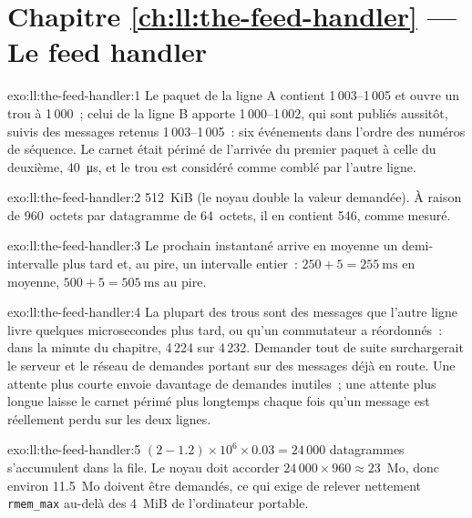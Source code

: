 \section*{Chapitre \ref{ch:ll:the-feed-handler} --- Le feed handler}

\begin{solution}{exo:ll:the-feed-handler:1}
Le paquet de la ligne A contient 1\,003--1\,005 et ouvre un trou à 1\,000~; celui de la ligne B apporte 1\,000--1\,002, qui sont publiés aussitôt,
suivis des messages retenus 1\,003--1\,005~: six événements dans l'ordre des numéros de séquence. Le carnet était périmé de l'arrivée du premier paquet à celle du
deuxième, \qty{40}{\micro\second}, et le trou est considéré comme comblé par l'autre ligne.
\end{solution}

\begin{solution}{exo:ll:the-feed-handler:2}
512~KiB (le noyau double la valeur demandée). À raison de 960~octets par datagramme de 64~octets, il en contient 546, comme mesuré.
\end{solution}

\begin{solution}{exo:ll:the-feed-handler:3}
Le prochain instantané arrive en moyenne un demi-intervalle plus tard et, au pire, un intervalle entier~: $250 + 5 = \qty{255}{\milli\second}$ en
moyenne, $500 + 5 = \qty{505}{\milli\second}$ au pire.
\end{solution}

\begin{solution}{exo:ll:the-feed-handler:4}
La plupart des trous sont des messages que l'autre ligne livre quelques microsecondes plus tard, ou qu'un commutateur a réordonnés~: dans la minute du
chapitre, 4\,224 sur 4\,232. Demander tout de suite surchargerait le serveur et le réseau de demandes portant sur des messages déjà en
route. Une attente plus courte envoie davantage de demandes inutiles~; une attente plus longue laisse le carnet périmé plus longtemps chaque fois qu'un message est réellement perdu
sur les deux lignes.
\end{solution}

\begin{solution}{exo:ll:the-feed-handler:5}
$(2 - 1.2) \times 10^6 \times 0.03 = 24\,000$ datagrammes s'accumulent dans la file. Le noyau doit accorder $24\,000 \times 960 \approx 23$~Mo, donc
environ 11.5~Mo doivent être demandés, ce qui exige de relever nettement \texttt{rmem\_max} au-delà des 4~MiB de l'ordinateur portable.
\end{solution}

